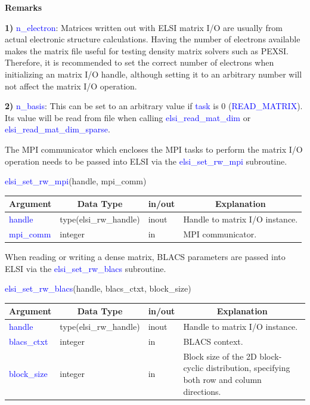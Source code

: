 \documentclass{report}
\newcommand{\tcb}[1]{\textcolor{blue}{#1}}
\begin{document}
\textbf{Remarks}

\textbf{1)} \tcb{n\_electron}: Matrices written out with ELSI matrix I/O are usually from actual electronic structure calculations. Having the number of electrons available makes the matrix file useful for testing density matrix solvers such as PEXSI. Therefore, it is recommended to set the correct number of electrons when initializing an matrix I/O handle, although setting it to an arbitrary number will not affect the matrix I/O operation.

\textbf{2)} \tcb{n\_basis}: This can be set to an arbitrary value if \tcb{task} is 0 (\tcb{READ\_MATRIX}). Its value will be read from file when calling \tcb{elsi\_read\_mat\_dim} or \tcb{elsi\_read\_mat\_dim\_sparse}.

The MPI communicator which encloses the MPI tasks to perform the matrix I/O operation needs to be passed into ELSI via the \tcb{elsi\_set\_rw\_mpi} subroutine.

\begin{labeling}{\hspace{6cm}}
\item [\hspace{0.3cm} \tcb{elsi\_set\_rw\_mpi}(handle, mpi\_comm)]
\end{labeling}

\begin{tabular}[]{|p{20mm}|p{45mm}|p{15mm}|p{85mm}|}
\hline
\multicolumn{1}{|c|}{\textbf{Argument}} & \multicolumn{1}{c|}{\textbf{Data Type}} & \multicolumn{1}{c|}{\textbf{in/out}} & \multicolumn{1}{c|}{\textbf{Explanation}}\\
\hline
\tcb{handle}    & type(elsi\_rw\_handle) & inout & Handle to matrix I/O instance.\\
\hline
\tcb{mpi\_comm} & integer                & in    & MPI communicator.\\
\hline
\end{tabular}

When reading or writing a dense matrix, BLACS parameters are passed into ELSI via the \tcb{elsi\_set\_rw\_blacs} subroutine.
\begin{labeling}{\hspace{6cm}}
\item [\hspace{0.3cm} \tcb{elsi\_set\_rw\_blacs}(handle, blacs\_ctxt, block\_size)]
\end{labeling}

\begin{tabular}[]{|p{20mm}|p{45mm}|p{15mm}|p{85mm}|}
\hline
\multicolumn{1}{|c|}{\textbf{Argument}} & \multicolumn{1}{c|}{\textbf{Data Type}} & \multicolumn{1}{c|}{\textbf{in/out}} & \multicolumn{1}{c|}{\textbf{Explanation}}\\
\hline
\tcb{handle}      & type(elsi\_rw\_handle) & inout & Handle to matrix I/O instance.\\
\hline
\tcb{blacs\_ctxt} & integer                & in    & BLACS context.\\
\hline
\tcb{block\_size} & integer                & in    & Block size of the 2D block-cyclic distribution, specifying both row and column directions.\\
\hline
\end{tabular}
\end{document}
